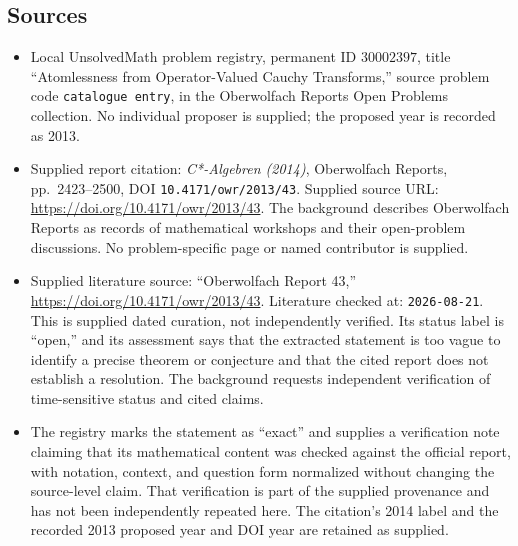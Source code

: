 \documentclass[11pt]{article}
\begin{document}
\subsection{Sources}
\begin{itemize}
\item Local UnsolvedMath problem registry, permanent ID \(30002397\), title ``Atomlessness from Operator-Valued Cauchy Transforms,'' source problem code \texttt{catalogue entry}, in the Oberwolfach Reports Open Problems collection. No individual proposer is supplied; the proposed year is recorded as 2013.
\item Supplied report citation: \emph{C*-Algebren (2014)}, Oberwolfach Reports, pp.\ 2423--2500, DOI \texttt{10.4171/owr/2013/43}. Supplied source URL: \url{https://doi.org/10.4171/owr/2013/43}. The background describes Oberwolfach Reports as records of mathematical workshops and their open-problem discussions. No problem-specific page or named contributor is supplied.
\item Supplied literature source: ``Oberwolfach Report 43,'' \url{https://doi.org/10.4171/owr/2013/43}. Literature checked at: \texttt{2026-08-21}. This is supplied dated curation, not independently verified. Its status label is ``open,'' and its assessment says that the extracted statement is too vague to identify a precise theorem or conjecture and that the cited report does not establish a resolution. The background requests independent verification of time-sensitive status and cited claims.
\item The registry marks the statement as ``exact'' and supplies a verification note claiming that its mathematical content was checked against the official report, with notation, context, and question form normalized without changing the source-level claim. That verification is part of the supplied provenance and has not been independently repeated here. The citation's 2014 label and the recorded 2013 proposed year and DOI year are retained as supplied.
\end{itemize}
\end{document}
